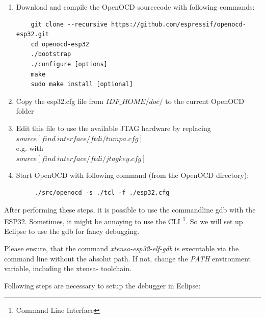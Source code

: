 \documentclass[]{scrreprt}%
\begin{document}
\begin{enumerate}
 \item Download and compile the OpenOCD sourcecode with following commands:\\
  \begin{lstlisting}
    git clone --recursive https://github.com/espressif/openocd-esp32.git
    cd openocd-esp32
    ./bootstrap
    ./configure [options]
    make
    sudo make install [optional]
  \end{lstlisting}
  \item Copy the esp32.cfg file from $IDF\_HOME/doc/$ to the current OpenOCD folder
  \item Edit this file to use the available JTAG hardware by replacing\\
    $source [find\ interface/ftdi/tumpa.cfg]$ \\
    e.g. with \\
    $source [find\ interface/ftdi/jtagkey.cfg]$
  \item Start OpenOCD with following command (from the OpenOCD directory):\\
    \begin{lstlisting}
     ./src/openocd -s ./tcl -f ./esp32.cfg
    \end{lstlisting}
\end{enumerate}

After performing these steps, it is possible to use the commandline gdb with the ESP32. Sometimes, it might be annoying to
use the CLI \footnote{Command Line Interface}. So we will set up Eclipse to use the gdb for fancy debugging.

Please ensure, that the command \textit{xtensa-esp32-elf-gdb} is executable via the command line without the absolut path.
If not, change the \textit{PATH} environment variable, including the xtensa- toolchain.

Following steps are necessary to setup the debugger in Eclipse:
\end{document}
